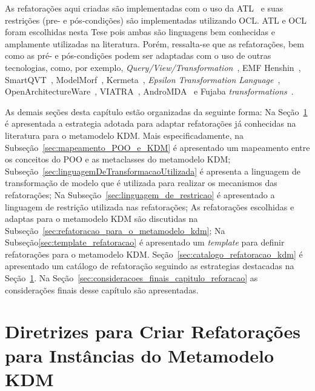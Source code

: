 
As refatorações aqui criadas são implementadas com o uso da ATL~\cite{Allilaire_06, Jouault_2005, Jouault_2008} e suas restrições (pre- e pós-condições) são implementadas utilizando OCL. ATL e OCL foram escolhidas nesta Tese pois ambas são linguagens bem conhecidas e amplamente utilizadas na literatura. Porém, ressalta-se que as refatorações, bem como as pré- e pós-condições podem ser adaptadas com o uso de outras tecnologias, como, por exemplo, \textit{Query/View/Transformation}~\cite{QVT:OMG}, EMF Henshin~\cite{EMF_Henshin}, SmartQVT~\cite{SmartQVT}, ModelMorf~\cite{ModelMorf}, Kermeta~\cite{kermeta}, \textit{Epsilon Transformation Language}~\cite{ETL_eclipse}, OpenArchitectureWare~\cite{OpenArchitectureWare}, VIATRA~\cite{viatra}, AndroMDA~\cite{andromda} e Fujaba \textit{transformations}~\cite{fujaba}.

As demais seções desta capítulo estão organizadas da seguinte forma: Na Seção~\ref{sec:estrategiasParaAdaptarRefatoracoesParaOMetamodeloKDM} é apresentada a estrategia adotada para adaptar refatorações já conhecidas na literatura para o metamodelo KDM. Mais especificadamente, na Subseção~\ref{sec:mapeamento_POO_e_KDM} é apresentado um mapeamento entre os conceitos do POO e as metaclasses do metamodelo KDM; Subseção~\ref{sec:linguagemDeTransformacaoUtilizada} é apresenta a linguagem de transformação de modelo que é utilizada para realizar os mecanismos das refatorações; Na Subseção~\ref{sec:linguagem_de_restricao} é apresentado a linguagem de restrição utilizada nas refatorações; As refatorações escolhidas e adaptas para o metamodelo KDM são discutidas na Subseção~\ref{sec:refatoracao_para_o_metamodelo_kdm}; Na Subseção\ref{sec:template_refatoracao} é apresentado um \textit{template} para definir refatorações para o metamodelo KDM. Seção~\ref{sec:catalogo_refatoracao_kdm} é apresentado um catálogo de refatoração seguindo as estrategias destacadas na Seção~\ref{sec:estrategiasParaAdaptarRefatoracoesParaOMetamodeloKDM}. Na Seção~\ref{sec:consideracoes_finais_capitulo_reforacao} as considerações finais desse capítulo são apresentadas.


\section{Diretrizes para Criar Refatorações para Instâncias do Metamodelo KDM}\label{sec:estrategiasParaAdaptarRefatoracoesParaOMetamodeloKDM}

